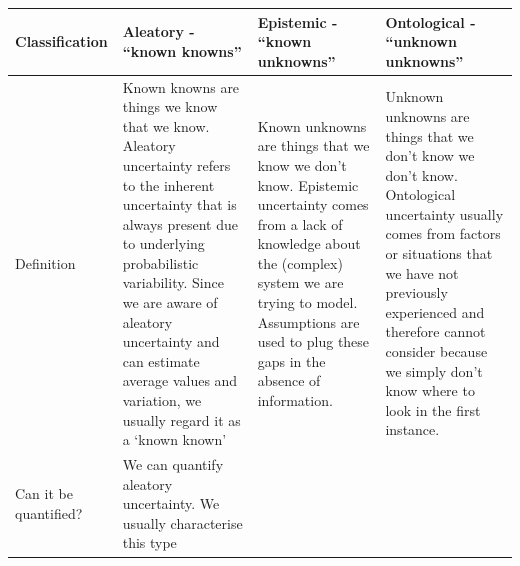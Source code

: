 \documentclass[]{book}
\begin{document}
\begin{longtable}[]{@{}llll@{}}
\toprule
\begin{minipage}[b]{0.14\columnwidth}\raggedright\strut
Classification\strut
\end{minipage} & \begin{minipage}[b]{0.22\columnwidth}\raggedright\strut
Aleatory - ``known knowns''\strut
\end{minipage} & \begin{minipage}[b]{0.25\columnwidth}\raggedright\strut
Epistemic - ``known unknowns''\strut
\end{minipage} & \begin{minipage}[b]{0.28\columnwidth}\raggedright\strut
Ontological - ``unknown unknowns''\strut
\end{minipage}\tabularnewline
\midrule
\endhead
\begin{minipage}[t]{0.14\columnwidth}\raggedright\strut
Definition\strut
\end{minipage} & \begin{minipage}[t]{0.22\columnwidth}\raggedright\strut
Known knowns are things we know that we know. Aleatory uncertainty
refers to the inherent uncertainty that is always present due to
underlying probabilistic variability. Since we are aware of aleatory
uncertainty and can estimate average values and variation, we usually
regard it as a `known known'\strut
\end{minipage} & \begin{minipage}[t]{0.25\columnwidth}\raggedright\strut
Known unknowns are things that we know we don't know. Epistemic
uncertainty comes from a lack of knowledge about the (complex) system we
are trying to model. Assumptions are used to plug these gaps in the
absence of information.\strut
\end{minipage} & \begin{minipage}[t]{0.28\columnwidth}\raggedright\strut
Unknown unknowns are things that we don't know we don't know.
Ontological uncertainty usually comes from factors or situations that we
have not previously experienced and therefore cannot consider because we
simply don't know where to look in the first instance.\strut
\end{minipage}\tabularnewline
\begin{minipage}[t]{0.14\columnwidth}\raggedright\strut
Can it be quantified? \strut
\end{minipage} & \begin{minipage}[t]{0.22\columnwidth}\raggedright\strut
We can quantify aleatory uncertainty. We usually characterise this type

\end{minipage}
\end{longtable}
\end{document}
